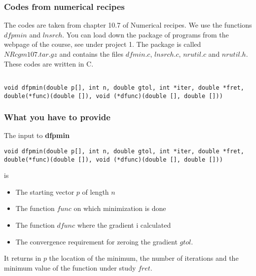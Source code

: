 \documentclass{beamer}
\begin{document}
\begin{frame}
\frametitle{Codes from numerical recipes}

\begin{block}{}
The codes are taken from chapter 10.7 of Numerical recipes.  We use the functions
$dfpmin$ and $lnsrch$.  You can load down the package of programs from the webpage of
the course, see under project 1.  
The package is called $NRcgm107.tar.gz$ and contains the files 
$dfmin.c$, $lnsrch.c$, $nrutil.c$ and $nrutil.h$. 
These codes are  written in C.
\begin{verbatim}

void dfpmin(double p[], int n, double gtol, int *iter, double *fret,
double(*func)(double []), void (*dfunc)(double [], double []))

\end{verbatim}
\end{block}
\end{frame}

\begin{frame}
\frametitle{What you have to provide}

\begin{block}{}
The input to \textbf{dfpmin}
\begin{verbatim}
void dfpmin(double p[], int n, double gtol, int *iter, double *fret,
double(*func)(double []), void (*dfunc)(double [], double []))
\end{verbatim}
is

\begin{itemize}
  \item The starting vector $p$ of length $n$

  \item The function $func$ on which minimization is done

  \item The function $dfunc$ where the gradient i calculated

  \item The convergence requirement for zeroing the gradient $gtol$.
\end{itemize}

\noindent
It returns in $p$ the location of the minimum, the number of iterations and 
the minimum value of the function under study $fret$.
\end{block}
\end{frame}
\end{document}
